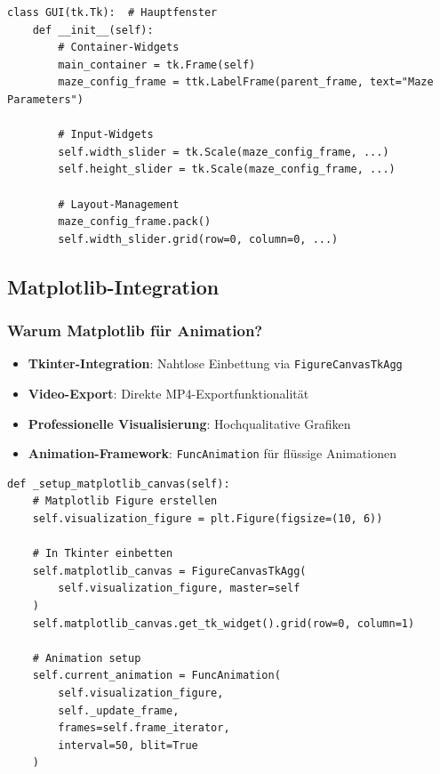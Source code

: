 \documentclass[12pt,a4paper]{article}
\begin{document}
\begin{lstlisting}[caption={Widget-Hierarchie in der Anwendung}]
class GUI(tk.Tk):  # Hauptfenster
    def __init__(self):
        # Container-Widgets
        main_container = tk.Frame(self)
        maze_config_frame = ttk.LabelFrame(parent_frame, text="Maze Parameters")
        
        # Input-Widgets  
        self.width_slider = tk.Scale(maze_config_frame, ...)
        self.height_slider = tk.Scale(maze_config_frame, ...)
        
        # Layout-Management
        maze_config_frame.pack()
        self.width_slider.grid(row=0, column=0, ...)
\end{lstlisting}

\subsection{Matplotlib-Integration}

\subsubsection{Warum Matplotlib für Animation?}

\begin{itemize}
    \item \textbf{Tkinter-Integration}: Nahtlose Einbettung via \texttt{FigureCanvasTkAgg}
    \item \textbf{Video-Export}: Direkte MP4-Exportfunktionalität
    \item \textbf{Professionelle Visualisierung}: Hochqualitative Grafiken
    \item \textbf{Animation-Framework}: \texttt{FuncAnimation} für flüssige Animationen
\end{itemize}

\begin{lstlisting}[caption={Matplotlib in Tkinter einbetten}]
def _setup_matplotlib_canvas(self):
    # Matplotlib Figure erstellen
    self.visualization_figure = plt.Figure(figsize=(10, 6))
    
    # In Tkinter einbetten
    self.matplotlib_canvas = FigureCanvasTkAgg(
        self.visualization_figure, master=self
    )
    self.matplotlib_canvas.get_tk_widget().grid(row=0, column=1)
    
    # Animation setup
    self.current_animation = FuncAnimation(
        self.visualization_figure, 
        self._update_frame,
        frames=self.frame_iterator,
        interval=50, blit=True
    )
\end{lstlisting}
\end{document}
